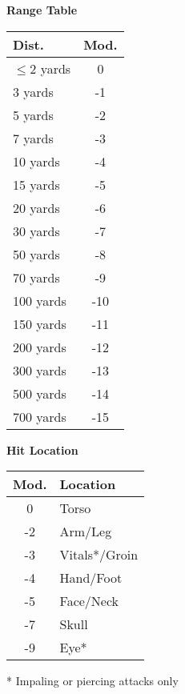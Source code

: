 \documentclass[11pt,a4paper,notitlepage]{article}
\begin{document}
\vspace{.1cm}
\linebreak
\begin{minipage}{.21\textwidth}
  \textbf{Range Table}\\
  \begin{tabularx}{\textwidth}{|X|c|} \hline
    Dist.& Mod. \\ \hline
    $\leq$2 yards&0\\ \hline
    3 yards&-1\\ \hline
    5 yards&-2\\ \hline
    7 yards&-3\\ \hline
    10 yards&-4\\ \hline
    15 yards&-5\\ \hline
    20 yards&-6\\ \hline
    30 yards&-7\\ \hline
    50 yards&-8\\ \hline
    70 yards&-9\\ \hline
    100 yards&-10\\ \hline
    150 yards&-11\\ \hline
    200 yards&-12\\ \hline
    300 yards&-13\\ \hline
    500 yards&-14\\ \hline
    700 yards&-15\\ \hline
  \end{tabularx}
  \vspace{.1cm}
  \linebreak  
  \textbf{Hit Location}\\
  \begin{tabularx}{\textwidth}{|c|X|} \hline
    Mod.& Location \\ \hline
    0&Torso\\ \hline
    -2&Arm/Leg\\ \hline
    -3&Vitals*/Groin\\ \hline
    -4&Hand/Foot\\ \hline
    -5&Face/Neck\\ \hline
    -7&Skull\\ \hline
    -9&Eye*\\ \hline
  \end{tabularx}
  * Impaling or piercing attacks only
\end{minipage}
\end{document}

